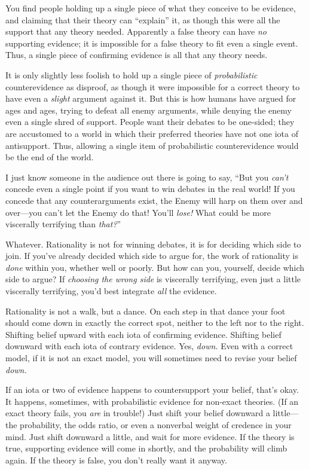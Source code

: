 {
 You find people holding up a single piece of what they conceive to
be evidence, and claiming that their theory can
``explain'' it, as though this were
all the support that any theory needed. Apparently a false theory can
have \textit{no} supporting evidence; it is impossible for a false
theory to fit even a single event. Thus, a single piece of confirming
evidence is all that any theory needs.}

{
 It is only slightly less foolish to hold up a single piece of
\textit{probabilistic} counterevidence as disproof, as though it were
impossible for a correct theory to have even a \textit{slight} argument
against it. But this is how humans have argued for ages and ages,
trying to defeat all enemy arguments, while denying the enemy even a
single shred of support. People want their debates to be one-sided;
they are accustomed to a world in which their preferred theories have
not one iota of antisupport. Thus, allowing a single item of
probabilistic counterevidence would be the end of the world.}

{
 I just know someone in the audience out there is going to say,
``But you \textit{can't} concede even
a single point if you want to win debates in the real world! If you
concede that any counterarguments exist, the Enemy will harp on them
over and over---you can't let the Enemy do that!
You'll \textit{lose!} What could be more viscerally
terrifying than \textit{that?}''}

{
 Whatever. Rationality is not for winning debates, it is for
deciding which side to join. If you've already decided
which side to argue for, the work of rationality is \textit{done}
within you, whether well or poorly. But how can you, yourself, decide
which side to argue? If \textit{choosing the wrong side} is viscerally
terrifying, even just a little viscerally terrifying,
you'd best integrate \textit{all} the evidence.}

{
 Rationality is not a walk, but a dance. On each step in that dance
your foot should come down in exactly the correct spot, neither to the
left nor to the right. Shifting belief upward with each iota of
confirming evidence. Shifting belief downward with each iota of
contrary evidence. Yes, \textit{down.} Even with a correct model, if it
is not an exact model, you will sometimes need to revise your belief
\textit{down.}}

{
 If an iota or two of evidence happens to countersupport your
belief, that's okay. It happens, sometimes, with
probabilistic evidence for non-exact theories. (If an exact theory
fails, you \textit{are} in trouble!) Just shift your belief downward a
little---the probability, the odds ratio, or even a nonverbal weight of
credence in your mind. Just shift downward a little, and wait for more
evidence. If the theory is true, supporting evidence will come in
shortly, and the probability will climb again. If the theory is false,
you don't really want it anyway.}

